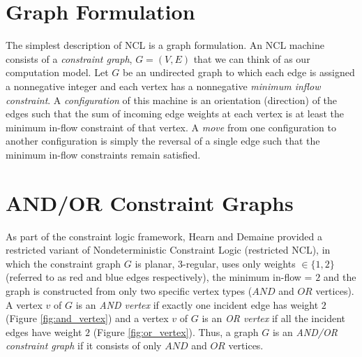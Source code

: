 \section{Graph Formulation}\label{sec:formalism}
The simplest description of NCL is a graph formulation. An NCL machine consists of a \textit{constraint graph}, $G = (V,E)$ that we can think of as
our computation model. Let $G$ be an undirected graph to which each edge is assigned a nonnegative integer and each vertex has a
nonnegative \textit{minimum inflow constraint}. A \textit{configuration} of this machine is an orientation (direction) of the edges such that the sum
of incoming edge weights at each vertex is at least the minimum in-ﬂow constraint of that vertex. A \textit{move} from one
configuration to another configuration is simply the reversal of a single edge such that the minimum in-ﬂow constraints remain satisﬁed.


\section{AND/OR Constraint Graphs} \label{sec:contraint_graph}
As part of the constraint logic framework,  Hearn and Demaine provided a restricted variant of Nondeterministic Constraint Logic (restricted NCL),
in which the constraint graph $G$ is planar, $3$-regular, uses only weights $ \in \{1,2\}$ (referred to as red and blue edges respectively), the minimum
in-flow = $2$ and the graph is constructed from only two specific vertex types ($AND$ and $OR$ vertices). A vertex $v$ of $G$ is an \textit{AND vertex}
if exactly one incident edge has weight $2$ (Figure \ref{fig:and_vertex}) and a vertex $v$ of $G$ is an \textit{OR vertex} if all the incident edges
have weight $2$ (Figure \ref{fig:or_vertex}). Thus, a graph $G$ is an \textit{AND/OR constraint graph} if it consists of only $AND$ and $OR$ vertices.

